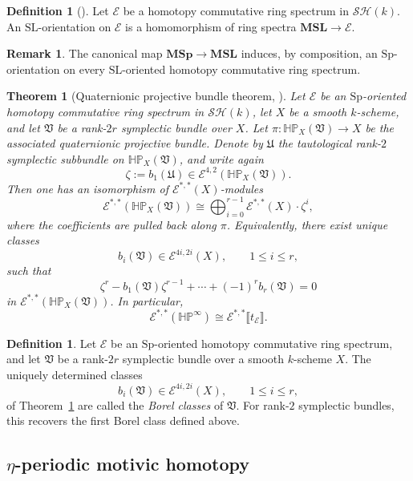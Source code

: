 \documentclass[a4paper]{amsart}
\theoremstyle{plain}
\newtheorem{theorem}[subsubsection]{Theorem}
\theoremstyle{definition}
\newtheorem{definition}[subsubsection]{Definition}
\newtheorem{remark}[subsubsection]{Remark}
\newcommand{\Sp}{\mathrm{Sp}}
\newcommand{\SL}{\mathrm{SL}}
\newcommand{\MSp}{\mathbf{MSp}}
\newcommand{\MSL}{\mathbf{MSL}}
\newcommand{\E}{\mathcal{E}}
\newcommand{\HP}{\mathbb{HP}}
\newcommand{\HPinf}{\HP^{\infty}}
\newcommand{\SH}{\mathcal{SH}}
\renewcommand{\le}{\leqslant}
\begin{document}
\begin{definition}[{\cite{panin2023on}}]\label{def:sl-orientation}
	Let $\E$ be a homotopy commutative ring spectrum in $\SH(k)$. An $\SL$-orientation on $\E$ is a homomorphism of ring spectra $\MSL\to \E$.
\end{definition}

\begin{remark}\label{rem:sl-induces-sp}
	The canonical map $\MSp\to \MSL$ induces, by composition, an $\Sp$-orientation on every $\SL$-oriented homotopy commutative ring spectrum.
\end{remark}

\begin{theorem}[Quaternionic projective bundle theorem, {\cite{panin2021quaternionic}}]\label{thm:quaternionic-projective-bundle}
	Let $\E$ be an $\Sp$-oriented homotopy commutative ring spectrum in $\SH(k)$, let $X$ be a smooth $k$-scheme, and let $\mathfrak{V}$ be a rank-$2r$ symplectic bundle over $X$. Let $\pi:\HP_X(\mathfrak{V})\to X$ be the associated quaternionic projective bundle. Denote by $\mathfrak U$ the tautological rank-$2$ symplectic subbundle on $\HP_X(\mathfrak{V})$, and write again
	\[
		\zeta:=b_1(\mathfrak U)\in \E^{4,2}(\HP_X(\mathfrak{V})).
	\]
	Then one has an isomorphism of $\E^{*,*}(X)$-modules
	\[
		\E^{*,*}(\HP_X(\mathfrak{V}))\cong \bigoplus_{i=0}^{r-1}\E^{*,*}(X)\cdot \zeta^i,
	\]
	where the coefficients are pulled back along $\pi$. Equivalently, there exist unique classes
	\[
		b_i(\mathfrak{V})\in \E^{4i,2i}(X),\qquad 1\le i\le r,
	\]
	such that
	\[
		\zeta^r-b_1(\mathfrak{V})\zeta^{r-1}+\cdots+(-1)^r b_r(\mathfrak{V})=0
	\]
	in $\E^{*,*}(\HP_X(\mathfrak{V}))$. In particular,
	\[
		\E^{*,*}(\HPinf) \cong \E^{*,*}\llbracket t_{\E} \rrbracket.
	\]
\end{theorem}

\begin{definition}\label{def:borel-classes}
	Let $\E$ be an $\Sp$-oriented homotopy commutative ring spectrum, and let $\mathfrak{V}$ be a rank-$2r$ symplectic bundle over a smooth $k$-scheme $X$. The uniquely determined classes
	\[
		b_i(\mathfrak{V})\in \E^{4i,2i}(X),\qquad 1\le i\le r,
	\]
	of Theorem~\ref{thm:quaternionic-projective-bundle} are called the \emph{Borel classes} of $\mathfrak{V}$. For rank-$2$ symplectic bundles, this recovers the first Borel class defined above.
\end{definition}

\subsection{\texorpdfstring{$\eta$}{η}-periodic motivic homotopy}
\end{document}
